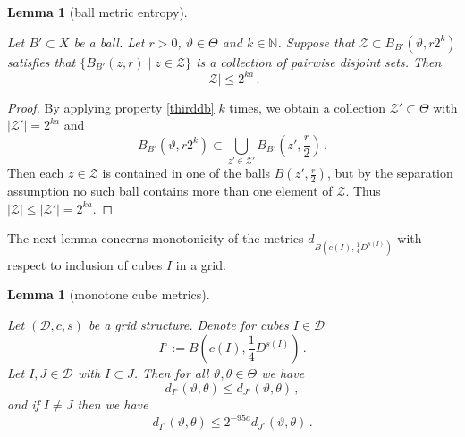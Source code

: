 \documentclass[10pt,a4paper]{article}
\theoremstyle{plain}
\newtheorem{lemma}[theorem]{Lemma}
\theoremstyle{definition}
\numberwithin{equation}{subsection}
\newcommand{\mfa}{{\vartheta}}
\newcommand{\mfb}{{\theta}}
\newcommand{\Mf}{{\Theta}}
\newcommand{\lean}[1]{}
\newcommand{\leanok}{}
\begin{document}
\begin{lemma}[ball metric entropy]
    \label{ball-metric-entropy}
    \leanok
    \lean{Θ.finite_and_mk_le_of_le_dist}
    Let $B' \subset X$ be a ball. Let $r > 0$, $\mfa \in \Mf$ and $k \in \mathbb{N}$. Suppose that $\mathcal{Z} \subset B_{B'}(\mfa, r2^k)$ satisfies that $\{B_{B'}(z,r)\mid z \in \mathcal{Z}\}$ is a collection of pairwise disjoint sets. Then
    $$ |\mathcal{Z}| \le 2^{ka}\,. $$
\end{lemma}

\begin{proof}
    \leanok
    By applying property \eqref{thirddb} $k$ times, we obtain a collection $\mathcal{Z}' \subset \Mf$ with $|\mathcal{Z}'| = 2^{ka}$ and
    $$
        B_{B'}(\mfa,r2^k) \subset \bigcup_{z' \in \mathcal{Z}'} B_{B'}(z', \frac{r}{2})\,.
    $$
    Then each $z \in \mathcal{Z}$ is contained in one of the balls $B(z', \frac{r}{2})$, but by the separation assumption no such ball contains more than one element of $\mathcal{Z}$. Thus $|\mathcal{Z}| \le |\mathcal{Z}'| = 2^{ka}$.
\end{proof}

The next lemma concerns monotonicity of the metrics $d_{B(c(I), \frac 14 D^{s(I)})}$ with respect to inclusion of cubes $I$ in a grid.

\begin{lemma}[monotone cube metrics]
    \label{monotone-cube-metrics}
    \leanok
    \lean{Grid.dist_mono, Grid.dist_strictMono}
    Let $(\mathcal{D}, c, s)$ be a grid structure. Denote for cubes $I \in \mathcal{D}$
    $$
        I^\circ := B(c(I), \frac{1}{4} D^{s(I)})\,.
    $$
    Let $I, J \in \mathcal{D}$ with $I \subset J$.
    Then for all $\mfa, \mfb \in\Mf$ we have
    $$
        d_{I^\circ}(\mfa, \mfb) \le d_{J^\circ}(\mfa, \mfb)\,,
    $$
    and if $I \ne J$ then we have
    $$
        d_{I^\circ}(\mfa, \mfb) \le 2^{-95a} d_{J^\circ}(\mfa, \mfb)\,.
    $$
\end{lemma}
\end{document}
